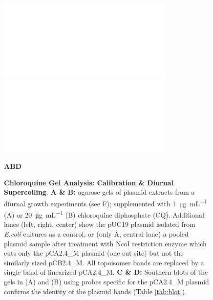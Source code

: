 \documentclass[10pt,letterpaper]{article}
\newcommand{\ugml}{\micro\gram\per\milli\liter}
\begin{document}
\begin{figure}[ht!]
  \begin{minipage}{.49\textwidth}
    \includegraphics[width=\textwidth]{figures/diurnal/20130620_pCA_CQ1.png}
  \end{minipage}
  \begin{minipage}{.49\textwidth}
    \includegraphics[width=\textwidth]{figures/diurnal/20130821_pCA_CQ20.png}
  \end{minipage}
  
  \vspace{-.5cm}
  \textbf{A}\hspace{.32\textwidth}\textbf{B}\hspace{.32\textwidth}\textbf{D}

  \caption{\textbf{Chloroquine Gel Analysis: Calibration \& Diurnal
      Supercoiling}. \small{\textbf{A \& B:} agarose gels of plasmid
      extracts from a diurnal growth experiments (see F); supplemented
      with \SI{1}{\ugml} (A) or \SI{20}{\ugml} (B) chloroquine
      diphosphate (CQ).  Additional lanes (left, right, center) show
      the pUC19 plasmid isolated from \textit{E.coli} cultures as a
      control, or (only A, central lane) a pooled plasmid sample after
      treatment with NcoI restriction enzyme which cuts only the
      pCA2.4\_M plasmid (one cut site) but not the similarly sized
      pCB2.4\_M. All topoisomer bands are replaced by a single band of
      linearized pCA2.4\_M. \textbf{C \& D:} Southern blots of the
      gels in (A) and (B) using probes specific for the pCA2.4\_M
      plasmid confirms the identity of the plasmid bands (Table
      \ref{tab:blot}).}}
    \label{fig:diurnalcq} 
\end{figure}
\end{document}
